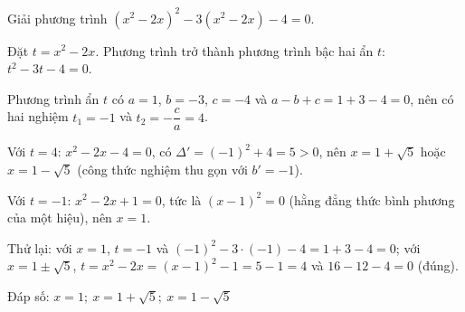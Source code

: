 \begin{problem}[9DS-PT2-047]
Giải phương trình $(x^2 - 2x)^2 - 3(x^2 - 2x) - 4 = 0$.

\begin{solution}
Đặt $t = x^2 - 2x$. Phương trình trở thành phương trình bậc hai ẩn $t$: $t^2 - 3t - 4 = 0$.

Phương trình ẩn $t$ có $a = 1$, $b = -3$, $c = -4$ và $a - b + c = 1 + 3 - 4 = 0$, nên có hai nghiệm $t_1 = -1$ và $t_2 = -\dfrac{c}{a} = 4$.

Với $t = 4$: $x^2 - 2x - 4 = 0$, có $\Delta' = (-1)^2 + 4 = 5 > 0$, nên $x = 1 + \sqrt{5}$ hoặc $x = 1 - \sqrt{5}$ (công thức nghiệm thu gọn với $b' = -1$).

Với $t = -1$: $x^2 - 2x + 1 = 0$, tức là $(x - 1)^2 = 0$ (hằng đẳng thức bình phương của một hiệu), nên $x = 1$.

Thử lại: với $x = 1$, $t = -1$ và $(-1)^2 - 3 \cdot (-1) - 4 = 1 + 3 - 4 = 0$; với $x = 1 \pm \sqrt{5}$, $t = x^2 - 2x = (x - 1)^2 - 1 = 5 - 1 = 4$ và $16 - 12 - 4 = 0$ (đúng).

Đáp số: $\boxed{x = 1;\ x = 1 + \sqrt{5};\ x = 1 - \sqrt{5}}$
\end{solution}
\end{problem}

